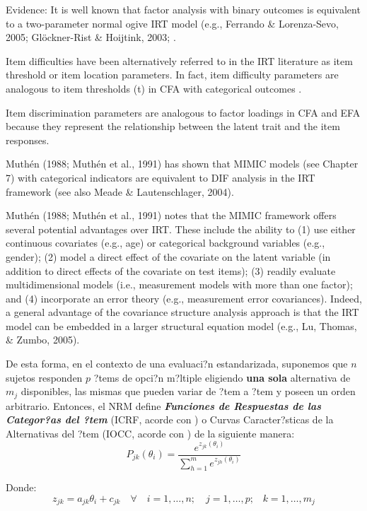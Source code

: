 Evidence:
It is well known that factor analysis with binary outcomes is equivalent to a two-parameter normal ogive IRT model (e.g., Ferrando & Lorenza-Sevo, 2005; Glöckner-Rist & Hoijtink, 2003; \citep{Kamata_et_al_2008, Takane_et_al_1987}.

Item difficulties have been alternatively referred to in the IRT literature as item threshold or item location parameters. In fact, item difficulty parameters are analogous to item thresholds (t) in CFA with categorical outcomes \citep{Muthen_et_al_1991}.

Item discrimination parameters are analogous to factor loadings in CFA and EFA because they represent the relationship between the latent trait and the item  responses.

Muthén (1988; Muthén et al., 1991) has shown that MIMIC models (see Chapter 7) with categorical indicators are equivalent to DIF analysis in the IRT framework (see also Meade & Lautenschlager, 2004).

Muthén (1988; Muthén et al., 1991) notes that the MIMIC framework offers several potential advantages over IRT. These include the ability to (1) use either continuous covariates (e.g., age) or categorical background  variables (e.g., gender); (2) model a direct effect of the covariate on the latent variable (in addition to direct effects of the covariate on test items); (3) readily  evaluate multidimensional models (i.e., measurement models with more than one factor); and (4) incorporate an error theory (e.g., measurement error covariances). Indeed, a general advantage of the covariance structure analysis approach is that the IRT model can be  embedded in a larger structural equation model (e.g., Lu, Thomas, & Zumbo, 2005).


De esta forma, en el contexto de una evaluaci?n estandarizada, suponemos que $n$ sujetos responden $p$ ?tems de opci?n m?ltiple eligiendo \textbf{una sola} alternativa de $m_j$ disponibles, las mismas que pueden variar de ?tem a ?tem y poseen un orden arbitrario. Entonces, el NRM define \textbf{\textit{Funciones de Respuestas de las Categor?as del ?tem}} (ICRF, acorde con \citealp{Ostini2006}) o Curvas Caracter?sticas de la Alternativas del ?tem (IOCC, acorde con \citealp{Ham_Swam1991}) de la siguiente manera:
\begin{equation}
	P_{jk}(\theta_i) = \dfrac{e^{z_{jk}(\theta_i)}}{\sum_{h=1}^{m}e^{z_{jh}(\theta_i)}} 
\end{equation}

Donde:
\begin{equation*}
z_{jk} = a_{jk}\theta_i + c_{jk} \quad \forall \quad i = 1, \dots, n; \quad j = 1, \dots, p \text{;} \quad k = 1, \dots, m_j
\end{equation*}

